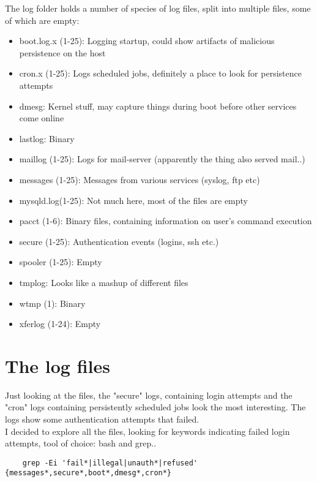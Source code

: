 \documentclass[
	letterpaper, %
	10pt, %
	unnumberedsections, %
	twoside, %
]{APAAssignment}
\begin{document}
The log folder holds a number of species of log files, split into multiple files, some of which are empty:

\begin{spacing}{1}
	\begin{itemize}
		\item boot.log.x (1-25): Logging startup, could show artifacts of malicious persistence on the host
		\item cron.x (1-25): Logs scheduled jobs, definitely a place to look for persistence attempts
		\item dmesg: Kernel stuff, may capture things during boot before other services come online
		\item lastlog: Binary
		\item maillog (1-25): Logs for mail-server (apparently the thing also served mail..)
		\item messages (1-25): Messages from various services (syslog, ftp etc)
		\item mysqld.log(1-25): Not much here, most of the files are empty
		\item pacct (1-6): Binary files, containing information on user's command execution
		\item secure (1-25): Authentication events (logins, ssh etc.)
		\item spooler (1-25): Empty
		\item tmplog: Looks like a mashup of different files
		\item wtmp (1): Binary
		\item xferlog (1-24): Empty
	\end{itemize}
\end{spacing}

\section{The log files}
Just looking at the files, the "secure" logs, containing login attempts and the "cron" logs containing persistently scheduled jobs look the most interesting. The logs show some authentication attempts that failed.\\
I decided to explore all the files, looking for keywords indicating failed login attempts, tool of choice: bash and grep..

\begin{verbatim}
	grep -Ei 'fail*|illegal|unauth*|refused' {messages*,secure*,boot*,dmesg*,cron*}
\end{verbatim}
\end{document}
